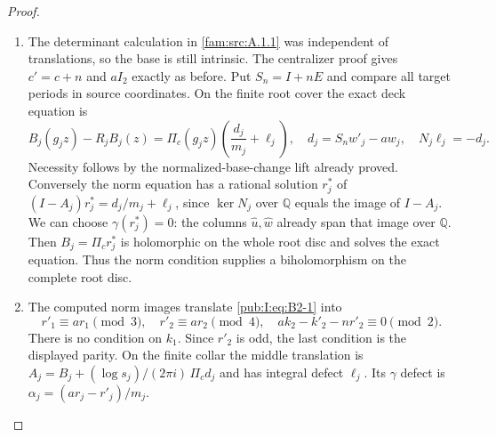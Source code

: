 \begin{proof}
\begin{enumerate}[label=\arabic*.,leftmargin=*]
\item The determinant calculation in \ref{fam:src:A.1.1} was independent of translations, so the base is still intrinsic. The centralizer proof gives $c'=c+n$ and $aI_2$ exactly as before. Put $S_n=I+nE$ and compare all target periods in source coordinates. On the finite root cover the exact deck equation is
\begin{equation}
 B_j(g_jz)-R_jB_j(z)=\Pi_c(g_jz)\left(\frac{d_j}{m_j}+\ell_j\right),
 \quad d_j=S_nw'_j-a w_j,
 \quad N_j\ell_j=-d_j.
\label{pub:I:eq:B2-1}
\end{equation}
Necessity follows by the normalized-base-change lift already proved. Conversely the norm equation has a rational solution $r_j^*$ of
$(I-A_j)r_j^*=d_j/m_j+\ell_j$, since $\ker N_j$ over $\mathbb Q$ equals the image of $I-A_j$. We can choose $\gamma(r_j^*)=0$: the columns $\widehat u,\widehat w$ already span that image over $\mathbb Q$. Then $B_j=\Pi_cr_j^*$ is holomorphic on the whole root disc and solves the exact equation. Thus the norm condition supplies a biholomorphism on the complete root disc.

\item The computed norm images translate \eqref{pub:I:eq:B2-1} into
\begin{equation}
 r'_1\equiv ar_1\pmod3,\quad r'_2\equiv ar_2\pmod4,
 \quad ak_2-k'_2-nr'_2\equiv0\pmod2.
\label{pub:I:eq:B2-2}
\end{equation}
There is no condition on $k_1$. Since $r'_2$ is odd, the last condition is the displayed parity. On the finite collar the middle translation is
$A_j=B_j+(\log s_j)/(2\pi i)\,\Pi_cd_j$ and has integral defect $\ell_j$. Its $\gamma$ defect is
$\alpha_j=(ar_j-r'_j)/m_j$.


\end{enumerate}
\end{proof}
